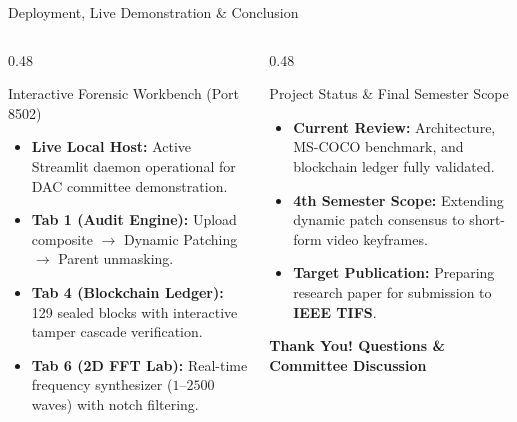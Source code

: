\documentclass[aspectratio=169,xcolor=table,10pt]{beamer}
\begin{document}
\begin{frame}{Deployment, Live Demonstration \& Conclusion}
  \begin{columns}[T]
    \begin{column}{0.48\textwidth}
      \begin{block}{Interactive Forensic Workbench (Port 8502)}
        \scriptsize
        \begin{itemize}\setlength{\itemsep}{1pt}
          \item \textbf{Live Local Host:} Active Streamlit daemon operational for DAC committee demonstration.
          \item \textbf{Tab 1 (Audit Engine):} Upload composite $\to$ Dynamic Patching $\to$ Parent unmasking.
          \item \textbf{Tab 4 (Blockchain Ledger):} 129 sealed blocks with interactive tamper cascade verification.
          \item \textbf{Tab 6 (2D FFT Lab):} Real-time frequency synthesizer ($1$--$2500$ waves) with notch filtering.
        \end{itemize}
      \end{block}
    \end{column}

    \begin{column}{0.48\textwidth}
      \begin{exampleblock}{Project Status \& Final Semester Scope}
        \scriptsize
        \begin{itemize}\setlength{\itemsep}{1pt}
          \item \textbf{Current Review:} Architecture, MS-COCO benchmark, and blockchain ledger fully validated.
          \item \textbf{4th Semester Scope:} Extending dynamic patch consensus to short-form video keyframes.
          \item \textbf{Target Publication:} Preparing research paper for submission to \textbf{IEEE TIFS}.
        \end{itemize}
      \end{exampleblock}
      \vspace{0.1cm}
      \begin{center}
        \normalsize \textbf{\textcolor{primarynavy}{Thank You! Questions \& Committee Discussion}}
      \end{center}
    \end{column}
  \end{columns}
\end{frame}
\end{document}
